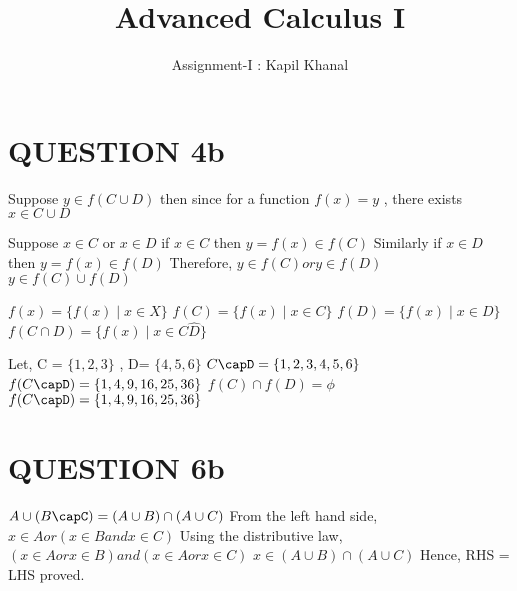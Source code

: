 \documentclass{article}
\title{Advanced Calculus I}
\author{Assignment-I : Kapil Khanal }
\date{ }
\begin{document}
\maketitle

\section{QUESTION 4b}


\begin{given}
Suppose $y \in f (C \cup D)$ 
    then since for a function $f(x) = y$ ,
    there exists $x \in C \cup D$ 
\end{given}

\begin{implications}
Suppose $x \in C$  or $x \in D$
    if $x \in C$ then $y= f(x) \in f(C)$ \newline
Similarly  if $x \in D$ then $y= f(x) \in f(D)$ \newline
Therefore, $y \in f(C) or y \in f(D)$ \\
    $y \in f(C) \cup f(D)$

\end{implications}

\begin{b}
$f(x) = \{f(x) \mid x \in X \} $ \newline
$f(C) = \{f(x) \mid x \in C\} $ \newline
$f(D) = \{f(x) \mid x \in D\} $ \newline
$f(C\cap D) = \{f(x) \mid x \in C\hat D \} $

Let, C = $\{1,2,3\}$ , D= $\{4,5,6\}$ \newline
$C\capD  = \{1,2,3,4,5,6\}$ \newline
$f(C\capD) = \{1,4,9,16,25,36\}$ \newline
$f(C)\cap f(D) = \phi$
$f(C\capD) = \{1,4,9,16,25,36\}$
\end{b} 

\section{QUESTION 6b}
\begin{c}

$A\cup(B\capC) = (A\cup B)\cap(A\cup C)$
From the left hand side, \newline
$x \in A or (x \in B and x \in C)$
Using the distributive law, \newline 
$(x \in A or x\in B) and (x \in A or x \in C)$ \newline
$x \in (A \cup B) \cap (A \cup C)$
Hence, RHS = LHS proved. 

\end{c}
\end{document}

